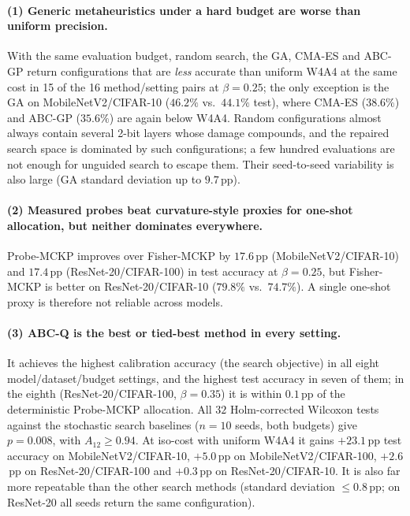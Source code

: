\documentclass[11pt,a4paper]{article}
\begin{document}
\paragraph{(1) Generic metaheuristics under a hard budget are worse than uniform precision.}
With the same evaluation budget, random search, the GA, CMA-ES and ABC-GP return
configurations that are \emph{less} accurate than uniform W4A4 at the same cost in 15 of the 16
method/setting pairs at $\beta=0.25$; the only exception is the GA on MobileNetV2/CIFAR-10
($46.2\%$ vs.\ $44.1\%$ test), where CMA-ES ($38.6\%$) and ABC-GP ($35.6\%$) are again below W4A4. Random configurations almost always contain several 2-bit layers whose damage compounds, and
the repaired search space is dominated by such configurations; a few hundred evaluations are not
enough for unguided search to escape them. Their seed-to-seed variability is also large (GA standard
deviation up to $9.7$\,pp).

\paragraph{(2) Measured probes beat curvature-style proxies for one-shot allocation, but neither
dominates everywhere.} Probe-MCKP improves over Fisher-MCKP by $17.6$\,pp (MobileNetV2/CIFAR-10) and
$17.4$\,pp (ResNet-20/CIFAR-100) in test accuracy at $\beta=0.25$, but Fisher-MCKP is better on
ResNet-20/CIFAR-10 ($79.8\%$ vs.\ $74.7\%$). A single one-shot proxy is therefore not reliable across
models.

\paragraph{(3) ABC-Q is the best or tied-best method in every setting.} It achieves the highest
calibration accuracy (the search objective) in all eight model/dataset/budget settings, and the highest
test accuracy in seven of them; in the eighth (ResNet-20/CIFAR-100, $\beta=0.35$) it is within
$0.1$\,pp of the deterministic Probe-MCKP allocation. All $32$ Holm-corrected Wilcoxon tests against the stochastic search baselines ($n=10$
seeds, both budgets) give $p=0.008$, with $A_{12}\ge0.94$. At iso-cost
with uniform W4A4 it gains $+23.1$\,pp test accuracy on MobileNetV2/CIFAR-10, $+5.0$\,pp on
MobileNetV2/CIFAR-100, $+2.6$\,pp on ResNet-20/CIFAR-100 and $+0.3$\,pp on ResNet-20/CIFAR-10. It is also far more repeatable than the other
search methods (standard deviation $\le0.8$\,pp; on ResNet-20 all seeds return the same configuration).
\end{document}
